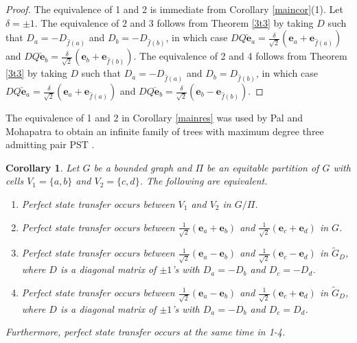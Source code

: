 \documentclass[12pt,a4paper]{article}
\newtheorem{cor}{Corollary}
\def \e {{\bf e}}
\def \e {{\mathbf e}}
\newcommand{\ob}[1]{\left(#1\right)}
\newcommand\sarojini[1]{{\bf \textcolor{magenta}{(Sarojini: #1)}}}
\begin{document}


\begin{proof}
The equivalence of 1 and 2 is immediate from Corollary \ref{maincor}(1). Let $\delta=\pm 1$. The equivalence of $2$ and $3$ follows from Theorem \ref{3t3} by taking $D$ such that $D_a=-D_{\hat{f}(a)}$ and $D_b=-D_{\hat{f}(b)}$, in which case $DQ\check{\e}_a=\frac{\delta}{\sqrt{2}}\ob{\e_a+\e_{\hat{f}(a)}}$ and $DQ\check{\e}_b=\frac{\delta}{\sqrt{2}}\ob{\e_b+\e_{\hat{f}(b)}}$. The equivalence of 2 and 4 follows from Theorem \ref{3t3} by taking $D$ such that $D_a=-D_{\hat{f}(a)}$ and $D_b=D_{\hat{f}(b)}$, in which case $DQ\check{\e}_a=\frac{\delta}{\sqrt{2}}\ob{\e_a+\e_{\hat{f}(a)}}$ and $DQ\check{\e}_b=\frac{\delta}{\sqrt{2}}\ob{\e_b-\e_{\hat{f}(b)}}$.
\end{proof}

The equivalence of 1 and 2 in Corollary \ref{mainres} was used by Pal and Mohapatra to obtain an infinite family of trees with maximum degree three admitting pair PST \cite{pal10}.
    
\begin{cor}
\label{mainres1}
Let $G$ be a bounded graph and $\Pi$ be an equitable partition of $G$ with cells $V_1=\{a,b\}$ and $V_2=\{c,d\}$.
The following are equivalent.
\begin{enumerate}
\item Perfect state transfer occurs between $V_1$ and $V_2$ in $G/\Pi$.
\item Perfect state transfer occurs between $\frac{1}{\sqrt2}(\e_a+\e_b)$ and $\frac{1}{\sqrt2}(\e_c+\e_d)$ in $G$.
\item Perfect state transfer occurs between $\frac{1}{\sqrt2}(\e_a-\e_{b})$ and $\frac{1}{\sqrt2}(\e_c-\e_{d})$ in $\tilde{G}_D$, where $D$ is a diagonal matrix of $\pm 1$'s with $D_a=-D_{b}$ and $D_c=-D_{d}$.
\item Perfect state transfer occurs between $\frac{1}{\sqrt2}(\e_a-\e_{b})$ and $\frac{1}{\sqrt2}(\e_c+\e_{d})$ in $\tilde{G}_D$, where $D$ is a diagonal matrix of $\pm 1$'s with $D_a=-D_b$ and $D_c=D_d$.
\end{enumerate}
Furthermore, perfect state transfer occurs at the same time in 1-4.
\end{cor}
\end{document}

